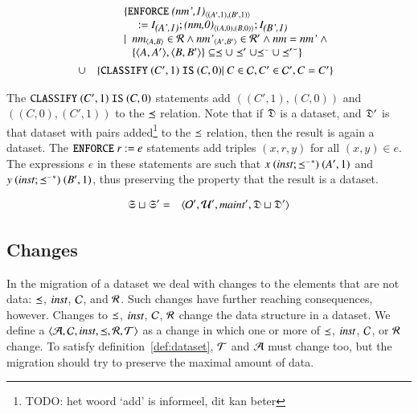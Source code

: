 \documentclass{elsarticle}
\begin{document}
\begin{definition}
	\begin{eqnarray}
		&&\begin{array}[t]{@{}l}
			\{ {\tt ENFORCE\ }\declare{(nm',1)}{(A',1)}{(B',1)}\\\quad{\tt\ :=\ }\ident{(A',1)};\declare{(nm,0)}{(A,0)}{(B,0)};\ident{(B',1)}\\
				\mid\ \begin{array}[t]{@{}l}
					\declare{nm}{A}{B}\in\rels\wedge\declare{nm'}{A'}{B'}\in\rels'\wedge\id{nm}=\id{nm'}\ \wedge\\
					\{\pair{A}{A'},\pair{B}{B'}\}\subseteq\isa\cup\isa'\cup\flip{\isa}\cup\flip{\isa'}\}
				   \end{array}
			  \end{array}\\
			  &\cup&\begin{array}[t]{@{}l}
				\{ {\tt CLASSIFY\ }(C',1){\tt\ IS\ }(C,0)|\ C\in\concepts,C'\in\concepts',C=C'\}\\
			  \end{array}
	\end{eqnarray}
\end{definition}

The ${\tt CLASSIFY\ }(C',1){\tt\ IS\ }(C,0)$ statements add $((C',1),(C,0))$ and  $((C,0),(C',1))$ to the $\preceq$ relation. Note that if $\mathfrak{D}$ is a dataset, and $\mathfrak{D}'$ is that dataset with pairs added\footnote{TODO: het woord `add' is informeel, dit kan beter} to the $\preceq$ relation, then the result is again a dataset.
The ${\tt ENFORCE\ }r{\tt\ :=\ }e$ statements add triples $(x,r,y)$ for all $(x,y)\in e$.
The expressions $e$ in these statements are such that $x\ (\text{\it inst\/} ; {{\preceq}^\smallsmile}^*)\ (A',1)$ and $y \ (\inst \compose \kleenestar{\flip{\isa}})\ (B',1)$, thus preserving the property that the result is a dataset.

\begin{definition}[]
	\begin{eqnarray}
		\mathfrak{S}\sqcup\mathfrak{S}'&=&\langle\mathcal{O}',\mathcal{U}',\text{\it maint\/}',\mathfrak{D}\sqcup\mathfrak{D}'\rangle
	\end{eqnarray}
\end{definition}

\subsection{Changes}
	In the migration of a dataset we deal with changes to the elements that are not data:
	$\preceq$, $\text{\it inst\/}$, $\mathcal{C}$, and $\mathcal{R}$.
	Such changes have further reaching consequences, however.
	Changes to $\preceq$, $\text{\it inst\/}$, $\mathcal{C}$, $\mathcal{R}$ change the data structure in a dataset.
	We define a  $\langle\mathcal{A},\mathcal{C},\text{\it inst\/},\preceq,\mathcal{R},\mathcal{T}\rangle$ as a change in which one or more of $\preceq$, $\text{\it inst\/}$, $\mathcal{C}$, or $\mathcal{R}$ change.
	To satisfy definition~\ref{def:dataset}, $\mathcal{T}$ and $\mathcal{A}$ must change too,
	but the migration should try to preserve the maximal amount of data.
\end{document}
